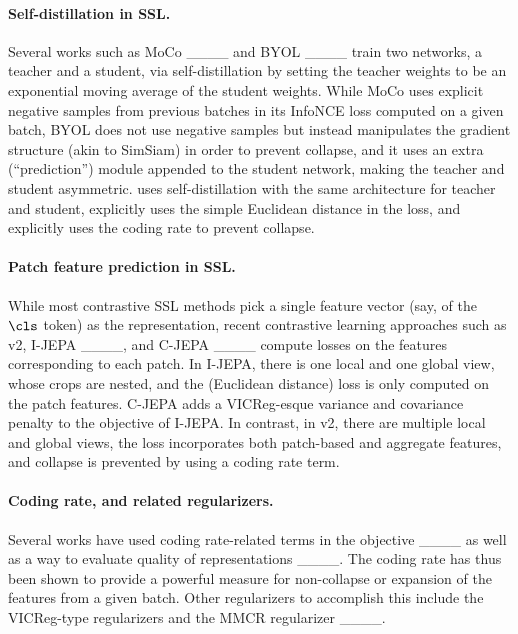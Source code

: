 \paragraph{Self-distillation in SSL.} Several works such as MoCo ____ and BYOL ____ train two networks, a teacher and a student, via self-distillation by setting the teacher weights to be an exponential moving average of the student weights. While MoCo uses explicit negative samples from previous batches in its InfoNCE loss computed on a given batch, BYOL does not use negative samples but instead manipulates the gradient structure (akin to SimSiam) in order to prevent collapse, and it uses an extra (``prediction'') module appended to the student network, making the teacher and student asymmetric. \simdino{} uses self-distillation with the same architecture for teacher and student, explicitly uses the simple Euclidean distance in the loss, and explicitly uses the coding rate to prevent collapse.


\paragraph{Patch feature prediction in SSL.} While most contrastive SSL methods pick a single feature vector (say, of the \(\cls\) token) as the representation, recent contrastive learning approaches such as \dino{}v2, I-JEPA ____, and C-JEPA ____ compute losses on the features corresponding to each patch. In I-JEPA, there is one local and one global view, whose crops are nested, and the (Euclidean distance) loss is only computed on the patch features. C-JEPA adds a VICReg-esque variance and covariance penalty to the objective of I-JEPA. In contrast, in \simdino{}v2, there are multiple local and global views, the loss incorporates both patch-based and aggregate features, and collapse is prevented by using a coding rate term.


\paragraph{Coding rate, and related regularizers.} Several works have used coding rate-related terms in the objective ____ as well as a way to evaluate quality of representations ____. The coding rate has thus been shown to provide a powerful measure for non-collapse or expansion of the features from a given batch. Other regularizers to accomplish this include the VICReg-type regularizers and the MMCR regularizer ____.